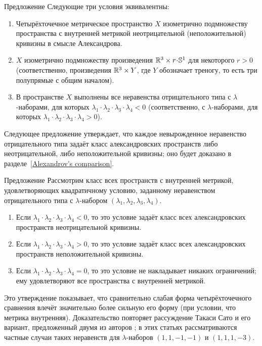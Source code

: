 \begin{thm}{Предложение}
Следующие три условия эквивалентны:
\begin{enumerate}
\item Четырёхточечное метрическое пространство $X$ изометрично подмножеству пространства с внутренней метрикой неотрицательной (неположительной) кривизны в смысле Александрова.
\item $X$ изометрично подмножеству произведения $\RR^3\times r\cdot \SSS^1$ для некоторого $r>0$ (соответственно, произведения $\mathbb{R}^3\times Y$, где $Y$ обозначает треногу, то есть три полупрямые с общим началом).
\item В пространстве $X$ выполнены все неравенства отрицательного типа с $\lambda$-наборами, для которых $\lambda_1\cdot\lambda_2\cdot\lambda_3\cdot\lambda_4<0$ (соответственно, с $\lambda$-наборами, для которых $\lambda_1\cdot\lambda_2\cdot\lambda_3\cdot\lambda_4>0$).
\end{enumerate}
\end{thm}

Следующее предложение утверждает, что каждое невырожденное неравенство отрицательного типа задаёт класс александровских пространств либо неотрицательной, либо неположительной кривизны; оно будет доказано в разделе~\ref{Alexandrov's comparison}.

\begin{thm}{Предложение}
Рассмотрим класс всех пространств с внутренней метрикой, удовлетворяющих квадратичному условию, заданному неравенством отрицательного типа с $\lambda$-набором $(\lambda_1,\lambda_2,\lambda_3,\lambda_4)$.
\begin{enumerate}
\item Если $\lambda_1\cdot\lambda_2\cdot\lambda_3\cdot\lambda_4<0$, то это условие задаёт класс всех александровских пространств неотрицательной кривизны.
\item Если $\lambda_1\cdot\lambda_2\cdot\lambda_3\cdot\lambda_4>0$, то это условие задаёт класс всех александровских пространств неположительной кривизны.
\item Если $\lambda_1\cdot\lambda_2\cdot\lambda_3\cdot\lambda_4=0$, то это условие не накладывает никаких ограничений; ему удовлетворяют все пространства с внутренней метрикой.
\end{enumerate}

\end{thm}

Это утверждение показывает, что сравнительно слабая форма четырёхточечного сравнения влечёт значительно более сильную его форму (при условии, что метрика внутренняя).
Доказательство повторяет рассуждение Такаси Сато \cite{sato} и его вариант, предложенный двумя из авторов \cite{lebedeva-petrunin-2010};
в этих статьях рассматриваются частные случаи таких неравенств для $\lambda$-наборов $(1,1,-1,-1)$ и $(1,1,1,-3)$.

